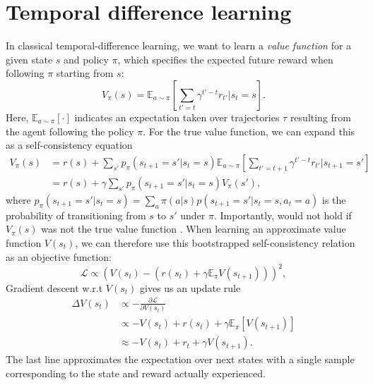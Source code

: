 \section{Temporal difference learning}
\label{sec:temporal_difference}

In classical temporal-difference learning, we want to learn a \emph{value function} for a given state $s$ and policy $\pi$, which specifies the expected future reward when following $\pi$ starting from $s$:
\begin{equation}
    \label{eq:V-values}
    V_{\pi}(s) = \mathbb{E}_{a \sim \pi} \left [ \sum_{t' = t} \gamma^{t' - t} r_{t'} | s_t = s \right ].
\end{equation}
Here, $\mathbb{E}_{a \sim \pi} [ \cdot ]$ indicates an expectation taken over trajectories $\tau$ resulting from the agent following the policy $\pi$.
For the true value function, we can expand this as a self-consistency equation
\begin{align}
    V_{\pi}(s) &= r(s) + \sum_{s'} p_{\pi}(s_{t+1} = s' | s_t = s) \mathbb{E}_{a \sim \pi} \left [ \sum_{t' = t+1} \gamma^{t' - t} r_{t'} | s_{t+1} = s' \right ] \\
    &=  r(s) + \gamma \sum_{s'} p_{\pi}(s_{t+1} = s' | s_t = s) V_{\pi}(s'),
    \label{eq:value_expansion}
\end{align}
where $p_{\pi}(s_{t+1} = s' | s_t = s) = \sum_a \pi(a|s) p(s_{t+1} = s' | s_t = s, a_t = a)$ is the probability of transitioning from $s$ to $s'$ under $\pi$.
Importantly,  would not hold if $V_{\pi}(s)$ was not the true value function \citep{sutton2018reinforcement}.
%
When learning an approximate value function $V(s_t)$, we can therefore use this bootstrapped self-consistency relation as an objective function:
\begin{equation}
    \mathcal{L} \propto \left (  V(s_t) - (r(s_t) + \gamma \mathbb{E}_\pi V(s_{t+1})) \right )^2,
\end{equation}
Gradient descent w.r.t $V(s_t)$ gives us an update rule
\begin{align}
    \Delta V(s_t) &\propto - \frac{\partial \mathcal{L}}{\partial V(s_t)}\\
    \label{eq:TD-learning_exp}
    &\propto - V(s_t) + r(s_t) + \gamma \mathbb{E}_\pi \left [ V(s_{t+1}) \right ]\\
    \label{eq:TD-learning}
    &\approx - V(s_t) + r_t + \gamma V(s_{t+1}).
\end{align}
The last line approximates the expectation over next states with a single sample corresponding to the state and reward actually experienced.
